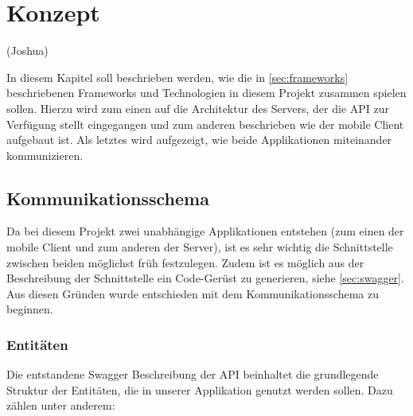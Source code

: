 \chapter{Konzept}

(Joshua)

In diesem Kapitel soll beschrieben werden, wie die in \autoref{sec:frameworks} beschriebenen Frameworks und Technologien in diesem Projekt zusammen spielen sollen. Hierzu wird zum einen auf die Architektur des Servers, der die API zur Verfügung stellt eingegangen und zum anderen beschrieben wie der mobile Client aufgebaut ist. Als letztes wird aufgezeigt, wie beide Applikationen miteinander kommunizieren.

	\section{Kommunikationsschema}
	Da bei diesem Projekt zwei unabhängige Applikationen entstehen (zum einen der mobile Client und zum anderen der Server), ist es sehr wichtig die Schnittstelle zwischen beiden möglichst früh festzulegen. Zudem ist es möglich aus der Beschreibung der Schnittstelle ein Code-Gerüst zu generieren, siehe \autoref{sec:swagger}. Aus diesen Gründen wurde entschieden mit dem Kommunikationsschema zu beginnen.
	
	\subsection{Entitäten}\label{sec:entities}
	
	Die entstandene Swagger Beschreibung der API beinhaltet die grundlegende Struktur der Entitäten, die in unserer Applikation genutzt werden sollen. Dazu zählen unter anderem:
	

